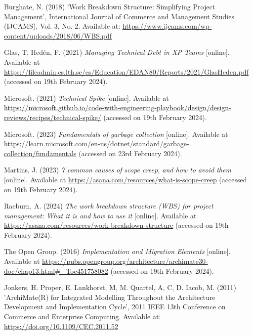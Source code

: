 \noindent Burghate, N. (2018) 'Work Breakdown Structure: Simplifying Project Management', International Journal of Commerce and Management Studies (IJCAMS), Vol. 3, No. 2. Available at: \url{https://www.ijcams.com/wp-content/uploads/2018/06/WBS.pdf}
\vspace{0.2cm}

\noindent Glas, T. Hedén, F. (2021) \textit{Managing Technical Debt in XP Teams} [online]. Available at \url{https://fileadmin.cs.lth.se/cs/Education/EDAN80/Reports/2021/GlasHeden.pdf} (accessed on 19th February 2024).
\vspace{0.2cm}

\noindent Microsoft. (2021) \textit{Technical Spike} [online]. Available at \url{https://microsoft.github.io/code-with-engineering-playbook/design/design-reviews/recipes/technical-spike/} (accessed on 19th February 2024).
\vspace{0.2cm}

\noindent Microsoft. (2023) \textit{Fundamentals of garbage collection} [online]. Available at \url{https://learn.microsoft.com/en-us/dotnet/standard/garbage-collection/fundamentals} (accessed on 23rd February 2024).
\vspace{0.2cm}

\noindent Martins, J. (2023) \textit{7 common causes of scope creep, and how to avoid them} [online]. Available at \url{https://asana.com/resources/what-is-scope-creep} (accessed on 19th February 2024).
\vspace{0.2cm}

\noindent Raeburn, A. (2024) \textit{The work breakdown structure (WBS) for project management: What it is and how to use it} [online]. Available at \url{https://asana.com/resources/work-breakdown-structure} (accessed on 19th February 2024).
\vspace{0.2cm}

\noindent The Open Group. (2016) \textit{Implementation and Migration Elements} [online]. Available at \url{https://pubs.opengroup.org/architecture/archimate30-doc/chap13.html#_Toc451758082} (accessed on 19th February 2024).
\vspace{0.2cm}

\noindent Jonkers, H. Proper, E. Lankhorst, M, M. Quartel, A, C, D. Iacob, M. (2011) 'ArchiMate(R) for Integrated Modelling Throughout the Architecture Development and Implementation Cycle', 2011 IEEE 13th Conference on Commerce and Enterprise Computing. Available at: \url{https://doi.org/10.1109/CEC.2011.52}
\vspace{0.2cm}

